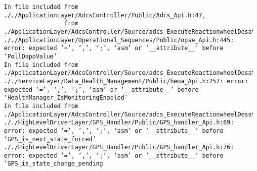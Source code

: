 \noindent\begin{minipage}{\textwidth}
\begin{lstlisting}[language={}, caption=Error obtained during mutant compilation process in ESAIL., label=miluerror]
In file included from ././ApplicationLayer/AdcsController/Public/Adcs_Api.h:47,
				 from ./ApplicationLayer/AdcsController/Source/adcs_ExecuteReactionwheelDesaturation.c:33:
././ApplicationLayer/Operational_Sequences/Public/opse_Api.h:445: error: expected ‘=’, ‘,’, ‘;’, ‘asm’ or ‘__attribute__’ before ‘PollDapoValue’
In file included from ./ApplicationLayer/AdcsController/Source/adcs_ExecuteReactionwheelDesaturation.c:38:
././ServiceLayer/Data_Health_Management/Public/hema_Api.h:257: error: expected ‘=’, ‘,’, ‘;’, ‘asm’ or ‘__attribute__’ before ‘HealthManager_IsMonitoringEnabled’
In file included from ./ApplicationLayer/AdcsController/Source/adcs_ExecuteReactionwheelDesaturation.c:41:
././HighLevelDriverLayer/GPS_Handler/Public/GPS_handler_Api.h:69: error: expected ‘=’, ‘,’, ‘;’, ‘asm’ or ‘__attribute__’ before ‘GPS_is_next_state_forced’
././HighLevelDriverLayer/GPS_Handler/Public/GPS_handler_Api.h:76: error: expected ‘=’, ‘,’, ‘;’, ‘asm’ or ‘__attribute__’ before ‘GPS_is_state_change_pending
\end{lstlisting}
\end{minipage}